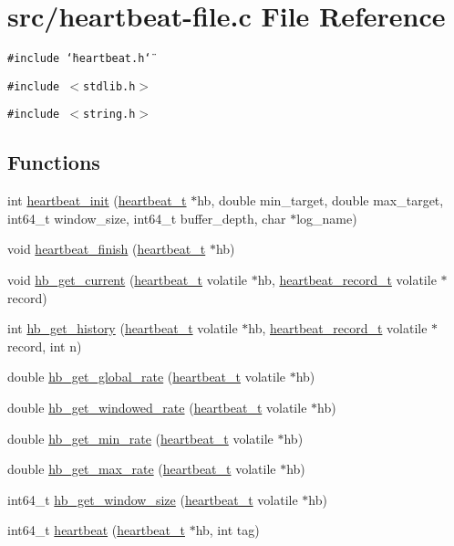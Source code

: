 \hypertarget{heartbeat-file_8c}{
\section{src/heartbeat-file.c File Reference}
\label{heartbeat-file_8c}
}
{\tt \#include \char`\"{}heartbeat.h\char`\"{}}\par
{\tt \#include $<$stdlib.h$>$}\par
{\tt \#include $<$string.h$>$}\par
\subsection*{Functions}
\begin{CompactItemize}
\item 
int \hyperlink{heartbeat-file_8c_b0215f451a25327778cf2469bbf17808}{heartbeat\_\-init} (\hyperlink{structheartbeat__t}{heartbeat\_\-t} $\ast$hb, double min\_\-target, double max\_\-target, int64\_\-t window\_\-size, int64\_\-t buffer\_\-depth, char $\ast$log\_\-name)
\item 
void \hyperlink{heartbeat-file_8c_472683cf2037492695c74b37944efca9}{heartbeat\_\-finish} (\hyperlink{structheartbeat__t}{heartbeat\_\-t} $\ast$hb)
\item 
void \hyperlink{heartbeat-file_8c_75042acfdcb08a614964eab511fe6299}{hb\_\-get\_\-current} (\hyperlink{structheartbeat__t}{heartbeat\_\-t} volatile $\ast$hb, \hyperlink{structheartbeat__record__t}{heartbeat\_\-record\_\-t} volatile $\ast$record)
\item 
int \hyperlink{heartbeat-file_8c_d75f7029162a84476c6e7411f59f86f2}{hb\_\-get\_\-history} (\hyperlink{structheartbeat__t}{heartbeat\_\-t} volatile $\ast$hb, \hyperlink{structheartbeat__record__t}{heartbeat\_\-record\_\-t} volatile $\ast$record, int n)
\item 
double \hyperlink{heartbeat-file_8c_55b60b6aa61bbb71ee099f2e7180540e}{hb\_\-get\_\-global\_\-rate} (\hyperlink{structheartbeat__t}{heartbeat\_\-t} volatile $\ast$hb)
\item 
double \hyperlink{heartbeat-file_8c_7afb09ea470be506247e69e874127be3}{hb\_\-get\_\-windowed\_\-rate} (\hyperlink{structheartbeat__t}{heartbeat\_\-t} volatile $\ast$hb)
\item 
double \hyperlink{heartbeat-file_8c_96fa03d16ef34067e63860cea57b71db}{hb\_\-get\_\-min\_\-rate} (\hyperlink{structheartbeat__t}{heartbeat\_\-t} volatile $\ast$hb)
\item 
double \hyperlink{heartbeat-file_8c_566d7911466aa84b09b1cb5c16fd1bb0}{hb\_\-get\_\-max\_\-rate} (\hyperlink{structheartbeat__t}{heartbeat\_\-t} volatile $\ast$hb)
\item 
int64\_\-t \hyperlink{heartbeat-file_8c_1e6ea5f3c95dd936082274969dba0ee8}{hb\_\-get\_\-window\_\-size} (\hyperlink{structheartbeat__t}{heartbeat\_\-t} volatile $\ast$hb)
\item 
int64\_\-t \hyperlink{heartbeat-file_8c_83cee6dbfb8365b1595ef200f45fe6fc}{heartbeat} (\hyperlink{structheartbeat__t}{heartbeat\_\-t} $\ast$hb, int tag)
\end{CompactItemize}


